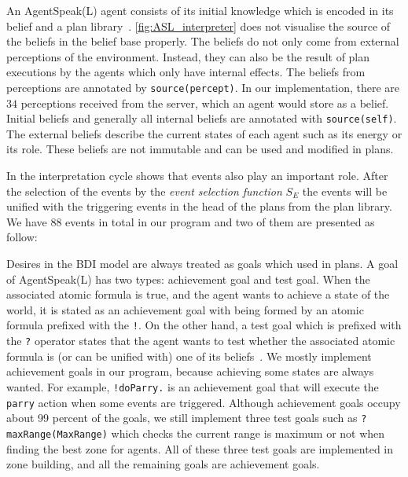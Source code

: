 An AgentSpeak(L) agent consists of its initial knowledge which is encoded in its belief and a plan library~\cite{rafael_BDIAgent_2005}.
\autoref{fig:ASL_interpreter} does not visualise the source of the beliefs in the belief base properly.
The beliefs do not only come from external perceptions of the environment. %
Instead, they can also be the result of plan executions by the agents which only have internal effects.
The beliefs from perceptions are annotated by \texttt{source(percept)}.
In our implementation, there are $34$ perceptions received from the server, which an agent would store as a belief.
Initial beliefs and generally all internal beliefs are annotated with \texttt{source(self)}.
The external beliefs describe the current states of each agent such as its energy or its role.
These beliefs are not immutable and can be used and modified in plans.

In the interpretation cycle shows that events also play an important role.
After the selection of the events by the \emph{event selection function} $S_E$ the events will be unified with the triggering events in the head of the plans from the plan library.
We have $88$ events in total in our program and two of them are presented as follow:

Desires in the BDI model are always treated as goals which used in plans.
A goal of AgentSpeak(L) has two types: achievement goal and test goal.
When the associated atomic formula is true, and the agent wants to achieve a state of the world, it is stated as an achievement goal with being formed by an atomic formula prefixed with the \texttt{!}.
On the other hand, a test goal which is prefixed with the \texttt{?} operator states that the agent wants to test whether the associated atomic formula is (or can be unified with) one of its beliefs~\cite{rafael_BDIAgent_2005}.
We mostly implement achievement goals in our program, because achieving some states are always wanted.
For example, \texttt{!doParry.} is an achievement goal that will execute the \texttt{parry} action when some events are triggered.
Although achievement goals occupy about 99 percent of the goals, we still implement three test goals such as \texttt{?maxRange(MaxRange)} which checks the current range is maximum or not when finding the best zone for agents.
All of these three test goals are implemented in zone building, and all the remaining goals are achievement goals.

